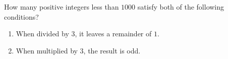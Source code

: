 How many positive integers less than $1000$ satisfy both of the following conditions?
\begin{enumerate}
\item[(1)] When divided by $3$, it leaves a remainder of $1$.
\item[(2)] When multiplied by $3$, the result is odd.
\end{enumerate}

